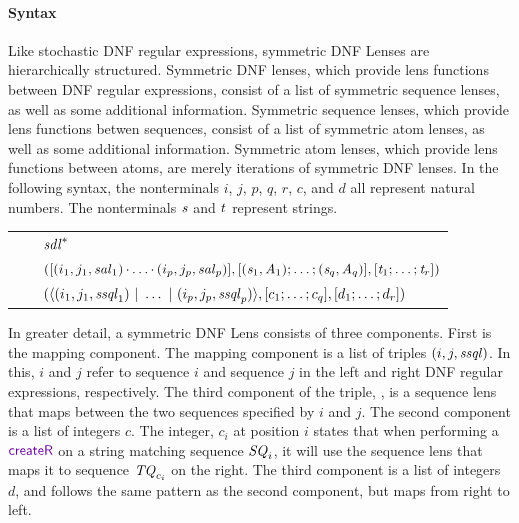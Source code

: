 \documentclass[acmsmall,screen,anonymous]{acmart}
\begin{document}
\paragraph*{Syntax}
Like stochastic DNF regular expressions, symmetric DNF Lenses are hierarchically
structured. Symmetric DNF lenses, which provide lens functions between DNF
regular expressions, consist of a list of symmetric sequence lenses, as well as
some additional information. Symmetric sequence lenses, which provide lens
functions betwen sequences, consist of a list of symmetric atom lenses, as well
as some additional information. Symmetric atom lenses, which provide lens
functions between atoms, are merely iterations of symmetric DNF lenses. In the
following syntax, the nonterminals $i$, $j$, $p$, $q$, $r$, $c$, and $d$ all
represent natural numbers. The nonterminals $\mathit{s}$ and $\mathit{t}$ represent
strings.
\begin{center}
  \begin{tabular}{@{}r@{\ }c@{}l@{}}
    \SAtomLens{} & \GEq{} & ${\mathit{sdl}}^*$ \\
    \SSQLens{} & \GEq{} & $([(i_1,j_1,\mathit{sal}_1)\mkern-1mu\cdot\mkern-1mu
                          \ldots\mkern-1mu\cdot\mkern-1mu
                          (i_p,j_p,\mathit{sal}_p)]
                          ,[ (\mathit{s}_1,\mathit{A}_1);\ldots;(\mathit{s}_q,\mathit{A}_q) ]
                          ,[ \mathit{t}_1;\ldots;\mathit{t}_r ])$ \\
    \SDNFLens{} & \GEq{} & $(\langle(i_1,j_1,\mathit{ssql}_1)~|~
                           \ldots~|~
                           (i_p,j_p,\mathit{ssql}_p)\rangle
                           ,[ c_1;\ldots;c_q ]
                           ,[ d_1;\ldots;d_r ])$ \\
  \end{tabular}
\end{center}

In greater detail, a symmetric DNF Lens \SDNFLens{} consists of three
components. First is the mapping component. The mapping component is a list of
triples $(i,j,\mathit{ssql})$. In this, $i$ and $j$ refer to sequence $i$ and
sequence $j$ in the left and right DNF regular expressions, respectively. The
third component of the triple, \SSQLens{}, is a sequence lens that maps between the two
sequences specified by $i$ and $j$. The second component is a list of integers
$c$. The integer, $c_i$ at position $i$ states that when performing a $\CreateR$
on a string matching sequence $\mathit{SQ}_i$, it will use the sequence lens that
maps it to sequence $\mathit{TQ}_{c_i}$ on the right. The third component is a
list of integers $d$, and follows the same pattern as the second component, but
maps from right to left.
\end{document}
